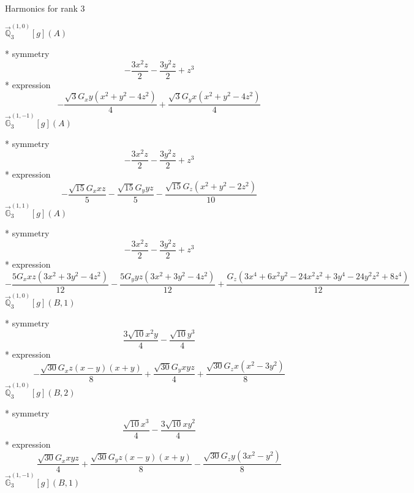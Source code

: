 \documentclass[fleqn,8pt]{jsarticle}
\begin{document}
\noindent * Harmonics for rank 3

\noindent\quad $\vec{\mathbb{Q}}_{3}^{(1,0)}[g](A)$

\noindent\quad ** symmetry
\begin{dmath*}
- \frac{3 x^{2} z}{2} - \frac{3 y^{2} z}{2} + z^{3}
\end{dmath*}
\noindent\quad ** expression
\begin{dmath*}
- \frac{\sqrt{3} G_{x} y \left(x^{2} + y^{2} - 4 z^{2}\right)}{4} + \frac{\sqrt{3} G_{y} x \left(x^{2} + y^{2} - 4 z^{2}\right)}{4}
\end{dmath*}
\noindent\quad $\vec{\mathbb{G}}_{3}^{(1,-1)}[g](A)$

\noindent\quad ** symmetry
\begin{dmath*}
- \frac{3 x^{2} z}{2} - \frac{3 y^{2} z}{2} + z^{3}
\end{dmath*}
\noindent\quad ** expression
\begin{dmath*}
- \frac{\sqrt{15} G_{x} x z}{5} - \frac{\sqrt{15} G_{y} y z}{5} - \frac{\sqrt{15} G_{z} \left(x^{2} + y^{2} - 2 z^{2}\right)}{10}
\end{dmath*}
\noindent\quad $\vec{\mathbb{G}}_{3}^{(1,1)}[g](A)$

\noindent\quad ** symmetry
\begin{dmath*}
- \frac{3 x^{2} z}{2} - \frac{3 y^{2} z}{2} + z^{3}
\end{dmath*}
\noindent\quad ** expression
\begin{dmath*}
- \frac{5 G_{x} x z \left(3 x^{2} + 3 y^{2} - 4 z^{2}\right)}{12} - \frac{5 G_{y} y z \left(3 x^{2} + 3 y^{2} - 4 z^{2}\right)}{12} + \frac{G_{z} \left(3 x^{4} + 6 x^{2} y^{2} - 24 x^{2} z^{2} + 3 y^{4} - 24 y^{2} z^{2} + 8 z^{4}\right)}{12}
\end{dmath*}
\noindent\quad $\vec{\mathbb{Q}}_{3}^{(1,0)}[g](B,1)$

\noindent\quad ** symmetry
\begin{dmath*}
\frac{3 \sqrt{10} x^{2} y}{4} - \frac{\sqrt{10} y^{3}}{4}
\end{dmath*}
\noindent\quad ** expression
\begin{dmath*}
- \frac{\sqrt{30} G_{x} z \left(x - y\right) \left(x + y\right)}{8} + \frac{\sqrt{30} G_{y} x y z}{4} + \frac{\sqrt{30} G_{z} x \left(x^{2} - 3 y^{2}\right)}{8}
\end{dmath*}
\noindent\quad $\vec{\mathbb{Q}}_{3}^{(1,0)}[g](B,2)$

\noindent\quad ** symmetry
\begin{dmath*}
\frac{\sqrt{10} x^{3}}{4} - \frac{3 \sqrt{10} x y^{2}}{4}
\end{dmath*}
\noindent\quad ** expression
\begin{dmath*}
\frac{\sqrt{30} G_{x} x y z}{4} + \frac{\sqrt{30} G_{y} z \left(x - y\right) \left(x + y\right)}{8} - \frac{\sqrt{30} G_{z} y \left(3 x^{2} - y^{2}\right)}{8}
\end{dmath*}
\noindent\quad $\vec{\mathbb{G}}_{3}^{(1,-1)}[g](B,1)$
\end{document}
